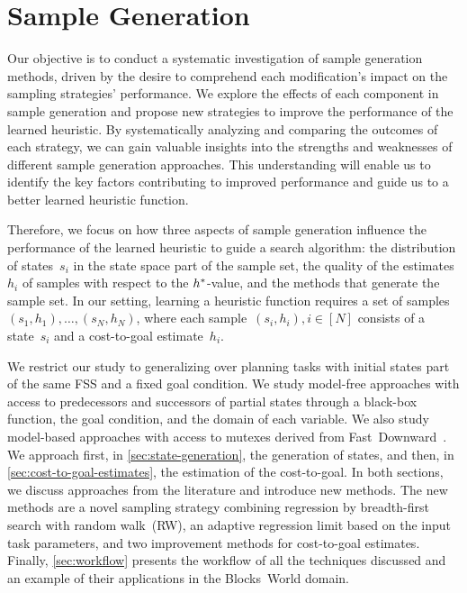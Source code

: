 \chapter{Sample Generation}
\label{sec:sampling}

Our objective is to conduct a systematic investigation of sample generation methods, driven by the desire to comprehend each modification's impact on the sampling strategies' performance. We explore the effects of each component in sample generation and propose new strategies to improve the performance of the learned heuristic. By systematically analyzing and comparing the outcomes of each strategy, we can gain valuable insights into the strengths and weaknesses of different sample generation approaches. This understanding will enable us to identify the key factors contributing to improved performance and guide us to a better learned heuristic function.

Therefore, we focus on how three aspects of sample generation influence the performance of the learned heuristic to guide a search algorithm: the distribution of states~$s_i$ in the state space part of the sample set, the quality of the estimates~$h_i$ of samples with respect to the $h^{*}$-value, and the methods that generate the sample set. In our setting, learning a heuristic function requires a set of samples~$(s_1,h_1),\ldots,(s_N,h_N)$, where each sample~$(s_i,h_i), i\in[N]$ consists of a state~$s_i$ and a cost-to-goal estimate~$h_i$.

We restrict our study to generalizing over planning tasks with initial states part of the same FSS and a fixed goal condition. We study model-free approaches with access to predecessors and successors of partial states through a black-box function, the goal condition, and the domain of each variable. We also study model-based approaches with access to mutexes derived from Fast~Downward~\cite{helmert2006fast}. We approach first, in \cref{sec:state-generation}, the generation of states, and then, in \cref{sec:cost-to-goal-estimates}, the estimation of the cost-to-goal. In both sections, we discuss approaches from the literature and introduce new methods. The new methods are a novel sampling strategy combining regression by breadth-first search with random walk~(RW), an adaptive regression limit based on the input task parameters, and two improvement methods for cost-to-goal estimates. Finally, \cref{sec:workflow} presents the workflow of all the techniques discussed and an example of their applications in the Blocks~World domain.

